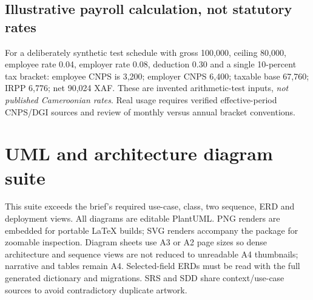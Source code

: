 \documentclass[10pt,a4paper]{article}
\begin{document}
\subsection{Illustrative payroll calculation, not statutory rates}
For a deliberately synthetic test schedule with gross 100,000, ceiling 80,000,
employee rate 0.04, employer rate 0.08, deduction 0.30 and a single 10-percent
tax bracket: employee CNPS is 3,200; employer CNPS 6,400; taxable base 67,760;
IRPP 6,776; net 90,024 XAF. These are invented arithmetic-test inputs,
\emph{not published Cameroonian rates}. Real usage requires verified effective-period
CNPS/DGI sources and review of monthly versus annual bracket conventions.

\clearpage
\section{UML and architecture diagram suite}\label{app:diagrams}
This suite exceeds the brief's required use-case, class, two sequence, ERD and
deployment views. All diagrams are editable PlantUML. PNG renders are embedded
for portable LaTeX builds; SVG renders accompany the package for zoomable inspection.
Diagram sheets use A3 or A2 page sizes so dense architecture and sequence views
are not reduced to unreadable A4 thumbnails; narrative and tables remain A4.
Selected-field ERDs must be read with the full generated dictionary and migrations.
SRS and SDD share context/use-case sources to avoid contradictory duplicate artwork.
\end{document}
